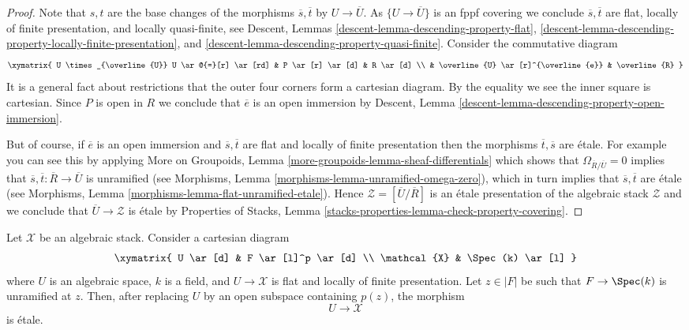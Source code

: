 \begin{proof}
\medskip\noindent
Note that $s, t$ are the base changes of the morphisms
$\overline{s}, \overline{t}$ by $U \to \overline{U}$.
As $\{U \to \overline{U}\}$ is an fppf covering we conclude
$\overline{s}, \overline{t}$ are flat, locally of finite presentation, and
locally quasi-finite, see
Descent, Lemmas \ref{descent-lemma-descending-property-flat},
\ref{descent-lemma-descending-property-locally-finite-presentation}, and
\ref{descent-lemma-descending-property-quasi-finite}.
Consider the commutative diagram
$$
\xymatrix{
U \times_{\overline{U}} U \ar@{=}[r] \ar[rd] & P \ar[r] \ar[d] & R \ar[d] \\
& \overline{U} \ar[r]^{\overline{e}} & \overline{R}
}
$$
It is a general fact about restrictions that the outer four corners
form a cartesian diagram. By the equality we see the inner square is
cartesian. Since $P$ is open in $R$ we conclude that $\overline{e}$
is an open immersion by
Descent, Lemma \ref{descent-lemma-descending-property-open-immersion}.

\medskip\noindent
But of course, if $\overline{e}$ is an open immersion and
$\overline{s}, \overline{t}$ are flat and locally of finite presentation
then the morphisms $\overline{t}, \overline{s}$ are \'etale.
For example you can see this by applying
More on Groupoids, Lemma \ref{more-groupoids-lemma-sheaf-differentials}
which shows that $\Omega_{\overline{R}/\overline{U}} = 0$
implies that $\overline{s}, \overline{t} : \overline{R} \to \overline{U}$
is unramified (see
Morphisms, Lemma \ref{morphisms-lemma-unramified-omega-zero}),
which in turn implies that $\overline{s}, \overline{t}$ are \'etale
(see
Morphisms, Lemma \ref{morphisms-lemma-flat-unramified-etale}).
Hence $\mathcal{Z} = [\overline{U}/\overline{R}]$ is an \'etale
presentation of the algebraic stack $\mathcal{Z}$ and we conclude that
$\overline{U} \to \mathcal{Z}$ is \'etale by
Properties of Stacks, Lemma
\ref{stacks-properties-lemma-check-property-covering}.
\end{proof}

\begin{lemma}
\label{lemma-etale-at-point}
Let $\mathcal{X}$ be an algebraic stack. Consider a cartesian diagram
$$
\xymatrix{
U \ar[d] & F \ar[l]^p \ar[d] \\
\mathcal{X} & \Spec(k) \ar[l]
}
$$
where $U$ is an algebraic space, $k$ is a field, and $U \to \mathcal{X}$
is flat and locally of finite presentation. Let $z \in |F|$ be such that
$F \to \Spec(k)$ is unramified at $z$. Then, after replacing $U$ by
an open subspace containing $p(z)$, the morphism
$$
U \longrightarrow \mathcal{X}
$$
is \'etale.
\end{lemma}

